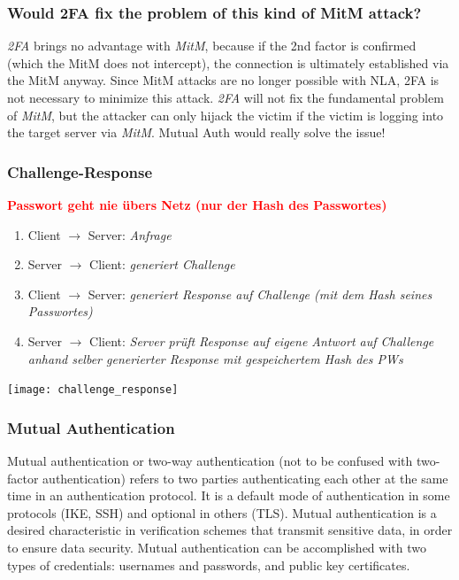 \subsubsection{Would 2FA fix the problem of this kind of MitM attack?}
\textit{2FA} brings no advantage with \textit{MitM}, because if the 2nd factor is confirmed (which the MitM does not intercept), the connection is ultimately established via the MitM anyway. Since MitM attacks are no longer possible with NLA, 2FA is not necessary to minimize this attack.
\textit{2FA} will not fix the fundamental problem of \textit{MitM}, but the attacker can only hijack the victim if the victim is logging into the target server via \textit{MitM}. Mutual Auth would really solve the issue!
\subsubsection{Challenge-Response}
\textcolor{red}{\textbf{Passwort geht nie übers Netz (nur der Hash des Passwortes)}}\\
\begin{minipage}{0.45\linewidth}
    \begin{enumerate}
        \item Client $\rightarrow$ Server: \textit{Anfrage}
        \item Server $\rightarrow$ Client: \textit{generiert Challenge}
        \item Client $\rightarrow$ Server: \textit{generiert Response auf Challenge (mit dem Hash seines Passwortes)}
        \item Server $\rightarrow$ Client: \textit{Server prüft Response auf eigene Antwort auf Challenge anhand selber generierter Response mit gespeichertem Hash des PWs}
    \end{enumerate}
\end{minipage}
\begin{minipage}{0.5\linewidth}
    \begin{center}
        \texttt{[image: challenge\_response]}
        \vspace{-8pt}
    \end{center}
\end{minipage}
\subsubsection{Mutual Authentication}
Mutual authentication or two-way authentication (not to be confused with two-factor authentication) refers to two parties authenticating each other at the same time in an authentication protocol.
It is a default mode of authentication in some protocols (IKE, SSH) and optional in others (TLS).
Mutual authentication is a desired characteristic in verification schemes that transmit sensitive data, in order to ensure data security.
Mutual authentication can be accomplished with two types of credentials: usernames and passwords, and public key certificates.

